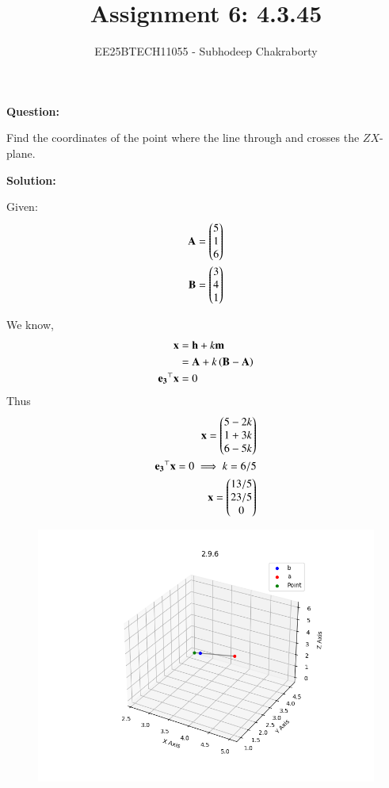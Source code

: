 \documentclass[journal,12pt,onecolumn]{IEEEtran}
\theoremstyle{remark}
\begin{document}

\vspace{3cm}

\title{Assignment 6: 4.3.45}
\author{EE25BTECH11055 - Subhodeep Chakraborty}
\maketitle
\hrulefill
\bigskip

\renewcommand{\thefigure}{\theenumi}
\renewcommand{\thetable}{\theenumi}

\textbf{Question:}\par
Find the coordinates of the point where the line through  and  crosses the $ZX$-plane.
\par
\textbf{Solution:}\par

Given:
\begin{align}
 \mathbf{A} = \begin{pmatrix}5\\1\\6\end{pmatrix} \\
 \mathbf{B} = \begin{pmatrix}3\\4\\1\end{pmatrix}
\end{align}

We know,
\begin{align}
 \mathbf{x} &= \mathbf{h} +k\mathbf{m} \\
 &= \mathbf{A} + k\left(\mathbf{B-A}\right) \\
 \mathbf{e_3}^\top\mathbf{x} &= 0
\end{align}
Thus
\begin{align}
 \mathbf{x} = \begin{pmatrix}5-2k \\ 1+3k \\ 6-5k\end{pmatrix} \\
  \mathbf{e_3}^\top\mathbf{x} = 0 \implies k = 6/5 \\
  \mathbf{x} = \begin{pmatrix}13/5 \\ 23/5 \\ 0\end{pmatrix}
\end{align}
\begin{figure}[H]
    \centering
    \includegraphics{figs/plot.png}
    \caption*{}
    \label{fig:plot}
\end{figure}
\end{document}
